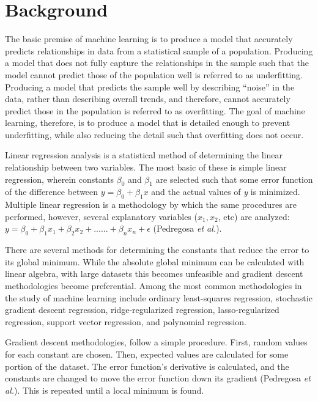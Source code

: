 \documentclass[12pt]{article}
\begin{document}
\section*{Background}
\par \qquad The basic premise of machine learning is to produce a model that accurately predicts relationships in data from a statistical sample of a population. Producing a model that does not fully capture the relationships in the sample such that the model cannot predict those of the population well is referred to as underfitting. Producing a model that predicts the sample well by describing “noise” in the data, rather than describing overall trends, and therefore, cannot accurately predict those in the population is referred to as overfitting. The goal of machine learning, therefore, is to produce a model that is detailed enough to prevent underfitting, while also reducing the detail such that overfitting does not occur.
\par Linear regression analysis is a statistical method of determining the linear relationship between two variables. The most basic of these is simple linear regression, wherein constants \emph{$\beta_0$}  and \emph{$\beta_1$} are selected such that some error function of the difference between \emph{$y = \beta_0 + \beta_1x$} and the actual values of \emph{y} is minimized. Multiple linear regression is a methodology by which the same procedures are performed, however, several explanatory variables ($x_{1}, x_{2}$, etc) are analyzed: \emph{$y=\beta_{0}+\beta_{1}x_{1}+\beta_{2}x_{2}+......+\beta_{n}x_{n}+ \epsilon$} (Pedregosa \emph{et al.}).
\par There are several methods for determining the constants that reduce the error to its global minimum. While the absolute global minimum can be calculated with linear algebra, with large datasets this becomes unfeasible and gradient descent methodologies become preferential. Among the most common methodologies in the study of machine learning include ordinary least-squares regression, stochastic gradient descent regression, ridge-regularized regression, lasso-regularized regression, support vector regression, and polynomial regression.
\par Gradient descent methodologies, follow a simple procedure. First, random values for each constant are chosen. Then, expected values are calculated for some portion of the dataset. The error function’s derivative is calculated, and the constants are changed to move the error function down its gradient (Pedregosa \emph{et al.}). This is repeated until a local minimum is found.
\end{document}
